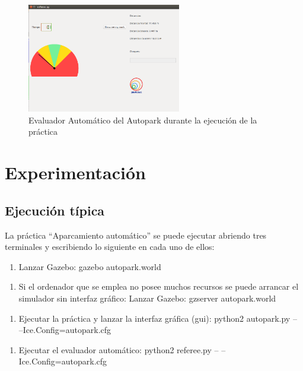 \begin{figure}[H]
  \begin{center}
    \includegraphics[width=0.6\textwidth]{figures/Autopark/Referee_DurantePractica.png}
		\caption{Evaluador Automático del Autopark durante la ejecución de la práctica}
		\label{fig.Referee_DurantePractica}
		\end{center}
\end{figure}


\section{Experimentación}

\subsection{Ejecución típica}
La práctica “Aparcamiento automático” se puede ejecutar abriendo tres terminales y escribiendo lo siguiente en cada uno de ellos:

\begin{enumerate}[1.]
\item Lanzar Gazebo: gazebo autopark.world
\end{enumerate}
\begin{enumerate}[1b.]
\item Si el ordenador que se emplea no posee muchos recursos se puede arrancar el simulador sin interfaz gráfico: Lanzar Gazebo: gzserver autopark.world
\end{enumerate}
\begin{enumerate}[2.]
\item	Ejecutar la práctica y lanzar la interfaz gráfica (\acrshort{gui}): python2 autopark.py -- --Ice.Config=autopark.cfg
\end{enumerate}
\begin{enumerate}[3.]
\item	Ejecutar el evaluador automático: python2 referee.py -- --Ice.Config=autopark.cfg
\end{enumerate}

